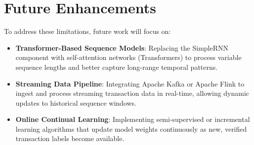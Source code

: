 \section{Future Enhancements}

To address these limitations, future work will focus on:
\begin{itemize}
    \item \textbf{Transformer-Based Sequence Models}: Replacing the SimpleRNN component with self-attention networks (Transformers) to process variable sequence lengths and better capture long-range temporal patterns.
    \item \textbf{Streaming Data Pipeline}: Integrating Apache Kafka or Apache Flink to ingest and process streaming transaction data in real-time, allowing dynamic updates to historical sequence windows.
    \item \textbf{Online Continual Learning}: Implementing semi-supervised or incremental learning algorithms that update model weights continuously as new, verified transaction labels become available.
\end{itemize}

